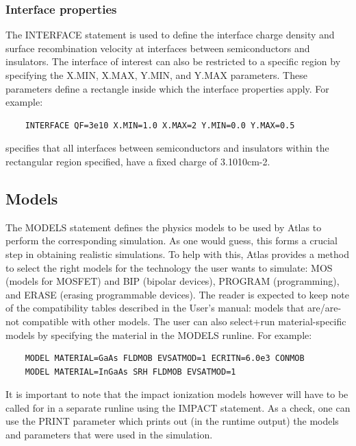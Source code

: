 \documentclass[11pt]{article}
\begin{document}
\subsubsection{Interface properties}
The INTERFACE statement is used to define the interface charge density and surface recombination velocity at interfaces between semiconductors and insulators. The interface of interest can also be restricted to a specific region by specifying the X.MIN, X.MAX, Y.MIN, and Y.MAX parameters. These parameters define a rectangle inside which the interface properties apply. For example:
\begin{verbatim}
    INTERFACE QF=3e10 X.MIN=1.0 X.MAX=2 Y.MIN=0.0 Y.MAX=0.5
\end{verbatim}
specifies that all interfaces between semiconductors and insulators within the rectangular region specified, have a fixed charge of 3.1010cm-2.

\subsection{Models}
The MODELS statement defines the physics models to be used by Atlas to perform the corresponding simulation. As one would guess, this forms a crucial step in obtaining realistic simulations. To help with this, Atlas provides a method to select the right models for the technology the user wants to simulate: MOS (models for MOSFET) and BIP (bipolar devices), PROGRAM (programming), and ERASE (erasing programmable devices). The reader is expected to keep note of the compatibility tables described in the User's manual: models that are/are-not compatible with other models.
\newline The user can also select+run material-specific models by specifying the material in the MODELS runline. For example:
\begin{verbatim}
    MODEL MATERIAL=GaAs FLDMOB EVSATMOD=1 ECRITN=6.0e3 CONMOB
    MODEL MATERIAL=InGaAs SRH FLDMOB EVSATMOD=1
\end{verbatim}
It is important to note that the impact ionization models however will have to be called for in a separate runline using the IMPACT statement. 
\newline As a check, one can use the PRINT parameter which prints out (in the runtime output) the models and parameters that were used in the simulation.
\end{document}

